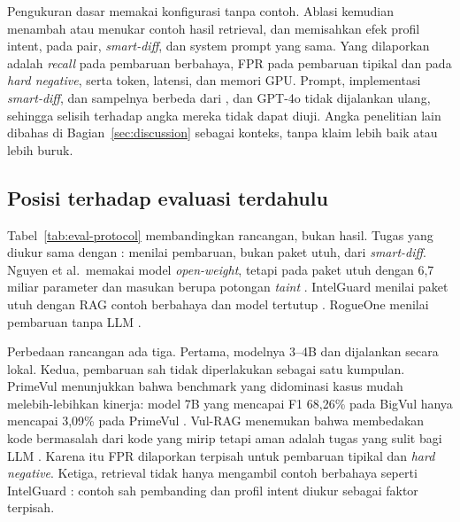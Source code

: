 \documentclass[a4paper,fleqn]{cas-dc}
\begin{document}
Pengukuran dasar memakai konfigurasi tanpa contoh. Ablasi kemudian menambah
atau menukar contoh hasil retrieval, dan memisahkan efek profil intent, pada
pair, \emph{smart-diff}, dan system prompt yang sama. Yang dilaporkan adalah
\emph{recall} pada pembaruan berbahaya, FPR pada pembaruan tipikal dan pada
\emph{hard negative}, serta token, latensi, dan memori GPU. Prompt,
implementasi \emph{smart-diff}, dan sampelnya berbeda dari
\citet{wyss2025evaluating}, dan GPT-4o tidak dijalankan ulang, sehingga selisih
terhadap angka mereka tidak dapat diuji. Angka penelitian lain dibahas di
Bagian~\ref{sec:discussion} sebagai konteks, tanpa klaim lebih baik atau lebih
buruk.

\subsection{Posisi terhadap evaluasi terdahulu}

Tabel~\ref{tab:eval-protocol} membandingkan rancangan, bukan hasil. Tugas yang
diukur sama dengan \citet{wyss2025evaluating}: menilai pembaruan, bukan paket
utuh, dari \emph{smart-diff}. Nguyen et al.\ memakai model \emph{open-weight},
tetapi pada paket utuh dengan 6,7 miliar parameter dan masukan berupa potongan
\emph{taint} \citep{nguyen2025taint}. IntelGuard menilai paket utuh dengan RAG
contoh berbahaya dan model tertutup \citep{guo2026bridging}. RogueOne menilai
pembaruan tanpa LLM \citep{sofaer2024rogueone}.

Perbedaan rancangan ada tiga. Pertama, modelnya 3--4B dan dijalankan secara
lokal. Kedua, pembaruan sah tidak diperlakukan sebagai satu kumpulan.
PrimeVul menunjukkan bahwa benchmark yang didominasi kasus mudah
melebih-lebihkan kinerja: model 7B yang mencapai F1 68,26\% pada BigVul hanya
mencapai 3,09\% pada PrimeVul \citep{ding2025vulnerability}. Vul-RAG menemukan
bahwa membedakan kode bermasalah dari kode yang mirip tetapi aman adalah tugas
yang sulit bagi LLM \citep{du2026vulrag}. Karena itu FPR dilaporkan terpisah
untuk pembaruan tipikal dan \emph{hard negative}. Ketiga, retrieval tidak
hanya mengambil contoh berbahaya seperti IntelGuard
\citep{guo2026bridging}: contoh sah pembanding dan profil intent diukur
sebagai faktor terpisah.
\end{document}
